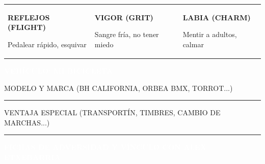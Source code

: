 \documentclass[10pt,a4paper,oneside]{book}
\newcommand{\field}[2][\linewidth]{%
  \begin{minipage}[t]{#1}
  \textcolor{InkSoft}{\terminalfont\scriptsize\MakeUppercase{#2}}\par
  \vspace{1.5mm}\textcolor{Line}{\rule{\linewidth}{0.45pt}}
  \end{minipage}}
\newcommand{\strip}[1]{%
  \vspace{1.5mm}\noindent
  \colorbox{CarbonSestao}{\parbox{\dimexpr\linewidth-2\fboxsep\relax}{%
    \textcolor{white}{\industrialfont\bfseries\small\MakeUppercase{#1}}}}\par
  \vspace{1.5mm}}
\begin{document}
\vspace{2mm}
\noindent
\begin{tabularx}{\linewidth}{X X X}
  \colorbox{RustPale}{\parbox{\dimexpr\linewidth-2\fboxsep\relax}{
    \textcolor{OxidoSestao}{\industrialfont\bfseries\small REFLEJOS (FLIGHT)}\par
    \vspace{1mm}\terminalfont\scriptsize Pedalear rápido, esquivar\par
    \vspace{2mm}\centering{\industrialfont\bfseries\Large [ \hspace{8mm} ]}
  }} &
  \colorbox{BluePale}{\parbox{\dimexpr\linewidth-2\fboxsep\relax}{
    \textcolor{AceroNervion}{\industrialfont\bfseries\small VIGOR (GRIT)}\par
    \vspace{1mm}\terminalfont\scriptsize Sangre fría, no tener miedo\par
    \vspace{2mm}\centering{\industrialfont\bfseries\Large [ \hspace{8mm} ]}
  }} &
  \colorbox{RustPale}{\parbox{\dimexpr\linewidth-2\fboxsep\relax}{
    \textcolor{OxidoSestao}{\industrialfont\bfseries\small LABIA (CHARM)}\par
    \vspace{1mm}\terminalfont\scriptsize Mentir a adultos, calmar\par
    \vspace{2mm}\centering{\industrialfont\bfseries\Large [ \hspace{8mm} ]}
  }}
\end{tabularx}

\strip{Vehículo: Mi Bicicleta}

\vspace{1mm}
\begin{minipage}[t]{0.48\linewidth}
  \field{Modelo y marca (BH California, Orbea BMX, Torrot...)}
\end{minipage}\hfill
\begin{minipage}[t]{0.48\linewidth}
  \field{Ventaja especial (Transportín, timbres, cambio de marchas...)}
\end{minipage}

\strip{Fichas de Adversidad y Vínculo con Alex Etxebarria}
\end{document}
